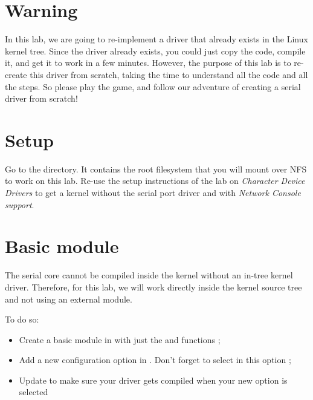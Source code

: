 
\section{Warning}

In this lab, we are going to re-implement a driver that already exists
in the Linux kernel tree. Since the driver already exists, you could
just copy the code, compile it, and get it to work in a few
minutes. However, the purpose of this lab is to re-create this driver
from scratch, taking the time to understand all the code and all the
steps. So please play the game, and follow our adventure of creating a
serial driver from scratch!

\section{Setup}

Go to the  directory. It
contains the root filesystem that you will mount over NFS to work on
this lab. Re-use the setup instructions of the lab on {\em Character
Device Drivers} to get a kernel without the serial port driver and
with {\em Network Console support}.

\section{Basic module}

The serial core cannot be compiled inside the kernel without an
in-tree kernel driver. Therefore, for this lab, we will work directly
inside the kernel source tree and not using an external module.

To do so:

\begin{itemize}

\item Create a basic module in  with
  just the  and  functions ;

\item Add a new configuration option in
  . Don't forget to select
   in this option ;

\item Update  to make sure your
  driver gets compiled when your new option is selected

\end{itemize}

